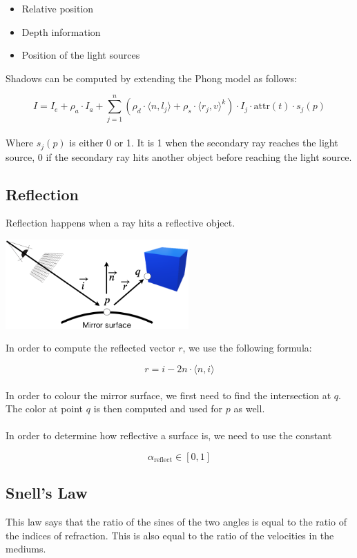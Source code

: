 \documentclass{article}
\begin{document}
\begin{itemize}
	\item Relative position
	\item Depth information
	\item Position of the light sources
\end{itemize}
Shadows can be computed by extending the Phong model as follows:

\[ I = I_e + \rho_a \cdot I_a + \sum^n_{j = 1} (\rho_d \cdot \langle n, l_j \rangle + \rho_s \cdot \langle r_j, v \rangle^k) \cdot I_j \cdot \text{attr}(t) \cdot s_j(p) \] \\
Where $s_j(p)$ is either 0 or 1. It is 1 when the secondary ray reaches the light source, 0 if the secondary ray hits another object before reaching the light source.

\subsection{Reflection}
Reflection happens when a ray hits a reflective object. \\

\begin{center}
	\includegraphics[width=7cm]{reflec.png}
\end{center}
\vspace{.3cm}
In order to compute the reflected vector $r$, we use the following formula:

\[ r = i - 2n \cdot \langle n, i \rangle \] \\
In order to colour the mirror surface, we first need to find the intersection at $q$. The color at point $q$ is then computed and used for $p$ as well. \\ \\
In order to determine how reflective a surface is, we need to use the constant

\[ \alpha_{\text{reflect}} \in [ 0, 1 ] \]

\subsection{Snell's Law}
This law says that the ratio of the sines of the two angles is equal to the ratio of the indices of refraction. This is also equal to the ratio of the velocities in the mediums.
\end{document}
